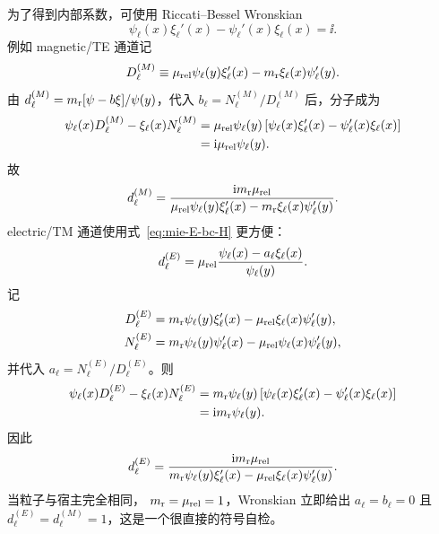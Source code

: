 为了得到内部系数，可使用 Riccati--Bessel Wronskian
\begin{equation}
\psi_\ell(x)\xi_\ell'(x)
-\psi_\ell'(x)\xi_\ell(x)=\ii.
\label{eq:riccati-wronskian}
\end{equation}
例如 magnetic/TE 通道记
\begin{equation}
D_\ell^{(M)}
\equiv
\mu_{\rm rel}\psi_\ell(y)\xi_\ell'(x)
-m_{\rm r}\xi_\ell(x)\psi_\ell'(y).
\end{equation}
由
$d_\ell^{(M)}=m_{\rm r}[\psi-b\xi]/\psi(y)$，代入
$b_\ell=N_\ell^{(M)}/D_\ell^{(M)}$ 后，分子成为
\begin{align}
\psi_\ell(x)D_\ell^{(M)}
-\xi_\ell(x)N_\ell^{(M)}
&=\mu_{\rm rel}\psi_\ell(y)
\left[
\psi_\ell(x)\xi_\ell'(x)
-\psi_\ell'(x)\xi_\ell(x)
\right]
\\
&=\mathrm{i}\mu_{\rm rel}\psi_\ell(y).
\end{align}
故
\begin{equation}
{
d_\ell^{(M)}
=\frac{\mathrm{i}m_{\rm r}\mu_{\rm rel}}
{\mu_{\rm rel}\psi_\ell(y)\xi_\ell'(x)
-m_{\rm r}\xi_\ell(x)\psi_\ell'(y)}.}
\label{eq:mie-internal-M}
\end{equation}
electric/TM 通道使用式~\cref{eq:mie-E-bc-H} 更方便：
\begin{equation}
d_\ell^{(E)}
=\mu_{\rm rel}
\frac{\psi_\ell(x)-a_\ell\xi_\ell(x)}{\psi_\ell(y)}.
\end{equation}
记
\begin{align}
D_\ell^{(E)}&=m_{\rm r}\psi_\ell(y)\xi_\ell'(x)
-\mu_{\rm rel}\xi_\ell(x)\psi_\ell'(y),\\
N_\ell^{(E)}&=m_{\rm r}\psi_\ell(y)\psi_\ell'(x)
-\mu_{\rm rel}\psi_\ell(x)\psi_\ell'(y),
\end{align}
并代入 $a_\ell=N_\ell^{(E)}/D_\ell^{(E)}$。则
\begin{align}
\psi_\ell(x)D_\ell^{(E)}-\xi_\ell(x)N_\ell^{(E)}
&=m_{\rm r}\psi_\ell(y)
\left[\psi_\ell(x)\xi_\ell'(x)-\psi_\ell'(x)\xi_\ell(x)\right]\\
&=\mathrm{i} m_{\rm r}\psi_\ell(y).
\end{align}
因此
\begin{equation}
{
d_\ell^{(E)}
=\frac{\mathrm{i}m_{\rm r}\mu_{\rm rel}}
{m_{\rm r}\psi_\ell(y)\xi_\ell'(x)
-\mu_{\rm rel}\xi_\ell(x)\psi_\ell'(y)}.}
\label{eq:mie-internal-E}
\end{equation}
当粒子与宿主完全相同，
$m_{\rm r}=\mu_{\rm rel}=1$，Wronskian 立即给出
$a_\ell=b_\ell=0$ 且
$d_\ell^{(E)}=d_\ell^{(M)}=1$，这是一个很直接的符号自检。

